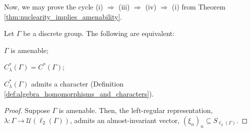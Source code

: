 Now, we may prove the cycle (i) $\Rightarrow $ (iii) $\Rightarrow$ (iv) $\Rightarrow$ (i) from Theorem \ref{thm:nuclearity_implies_amenability}.
\begin{theorem}
  Let $\Gamma$ be a discrete group. The following are equivalent:
  \begin{description}[font=\normalfont]
    \item[(i)] $\Gamma$ is amenable;
    \item[(iii)] $C^{\ast}_{\lambda}\left( \Gamma \right) = C^{\ast}\left( \Gamma \right)$;
    \item[(iv)] $C^{\ast}_{\lambda}\left( \Gamma \right)$ admits a character (Definition \ref{def:algebra_homomorphisms_and_characters}).
  \end{description}
\end{theorem}
\begin{proof}
  Suppose $\Gamma$ is amenable. Then, the left-regular representation, $\lambda\colon \Gamma\rightarrow \mathcal{U}\left( \ell_2\left( \Gamma \right) \right)$, admits an almost-invariant vector, $\left( \xi_n \right)_n\subseteq S_{\ell_2\left( \Gamma \right)}$.\newline


\end{proof}
